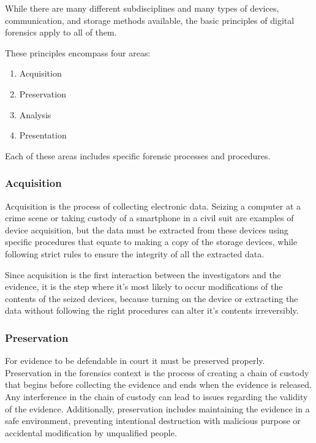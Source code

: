 While there are many different subdisciplines and many types of devices, communication,
and storage methods available, the basic principles of digital forensics
apply to all of them.

These principles encompass four areas:

\begin{enumerate}
\item Acquisition
\item Preservation
\item Analysis
\item Presentation
\end{enumerate}

Each of these areas includes specific forensic processes and procedures.

\subsubsection*{Acquisition}

Acquisition is the process of collecting electronic data. Seizing a computer at a crime scene or
taking custody of a smartphone in a civil suit are examples of device acquisition, but the data 
must be extracted from these devices using specific procedures that equate to making a copy of
the storage devices, while following strict rules to ensure the integrity of all the extracted data.

Since acquisition is the first interaction between the investigators and the evidence,
it is the step where it's most likely to occur modifications of the contents of the seized devices,
because turning on the device or extracting the data without following the right procedures can alter
it's contents irreversibly.

\subsubsection*{Preservation}

For evidence to be defendable in court it must be preserved properly.
Preservation in the forensics context is the process of creating a chain of custody \cite{custody}
that begins before collecting the evidence and ends when the evidence is released.
Any interference in the chain of custody can lead to issues regarding the validity of the evidence.
Additionally, preservation includes maintaining the evidence in a safe environment, preventing
intentional destruction with malicious purpose or accidental modification by unqualified people.

